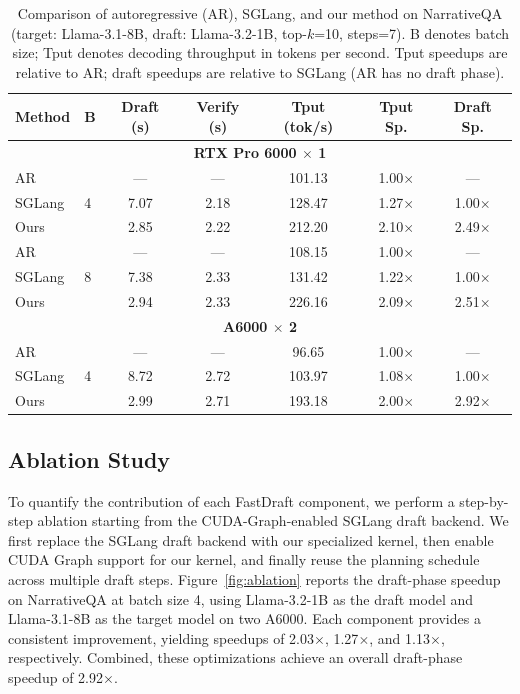 \documentclass{article}
\begin{document}
\begin{table}
\centering
\caption{Comparison of autoregressive (AR), SGLang, and our method on NarrativeQA 
(target: Llama-3.1-8B, draft: Llama-3.2-1B, top-$k$=10, steps=7). 
B denotes batch size; Tput denotes decoding throughput in tokens per second. 
Tput speedups are relative to AR; draft speedups are relative to SGLang 
(AR has no draft phase).}
\label{tab:batch-e2e}
\footnotesize
\setlength{\tabcolsep}{4pt}
\renewcommand{\arraystretch}{0.95}
\begin{tabular}{llccccc}
\toprule
Method & B & Draft (s) & Verify (s) & Tput (tok/s) & Tput Sp. & Draft Sp. \\
\midrule
\multicolumn{7}{c}{\textbf{RTX Pro 6000 $\times$ 1}} \\
\midrule
AR             & \multirow{3}{*}{4} & ---  & ---  & 101.13 & 1.00$\times$ & --- \\
SGLang         &                    & 7.07 & 2.18 & 128.47 & 1.27$\times$ & 1.00$\times$ \\
Ours           &                    & 2.85 & 2.22 & 212.20 & 2.10$\times$ & 2.49$\times$ \\
\midrule
AR             & \multirow{3}{*}{8} & ---  & ---  & 108.15 & 1.00$\times$ & --- \\
SGLang         &                    & 7.38 & 2.33 & 131.42 & 1.22$\times$ & 1.00$\times$ \\
Ours           &                    & 2.94 & 2.33 & 226.16 & 2.09$\times$ & 2.51$\times$ \\
\midrule
\multicolumn{7}{c}{\textbf{A6000 $\times$ 2}} \\
\midrule
AR             & \multirow{3}{*}{4} & ---  & ---  & 96.65  & 1.00$\times$ & --- \\
SGLang         &                    & 8.72 & 2.72 & 103.97 & 1.08$\times$ & 1.00$\times$ \\
Ours           &                    & 2.99 & 2.71 & 193.18 & 2.00$\times$ & 2.92$\times$ \\
\bottomrule
\end{tabular}
\end{table}

\subsection{Ablation Study}
To quantify the contribution of each FastDraft component, we perform a step-by-step ablation starting from the CUDA-Graph-enabled SGLang draft backend. We first replace the SGLang draft backend with our specialized kernel, then enable CUDA Graph support for our kernel, and finally reuse the planning schedule across multiple draft steps. Figure~\ref{fig:ablation} reports the draft-phase speedup on NarrativeQA at batch size 4, using Llama-3.2-1B as the draft model and Llama-3.1-8B as the target model on two A6000.  Each component provides a consistent improvement, yielding speedups of 2.03$\times$, 1.27$\times$, and 1.13$\times$, respectively. Combined, these optimizations achieve an overall draft-phase speedup of 2.92$\times$.
\end{document}
